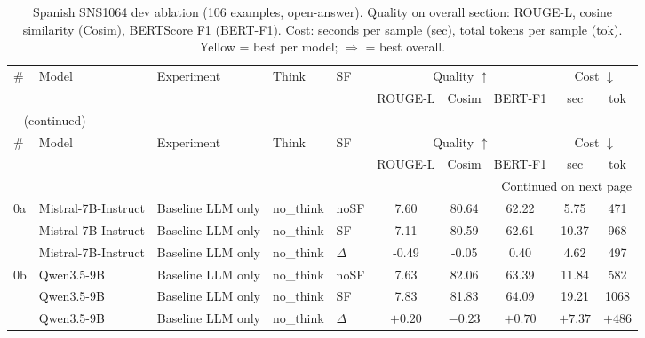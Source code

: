 \begin{scriptsize}
\setlength{\tabcolsep}{3pt}
\setlength{\LTcapwidth}{\linewidth}
\begin{longtable}{l l l l l c c c c c}
\caption[Spanish SNS-1064 dev ablation]{Spanish SNS1064 dev ablation (106 examples, open-answer). Quality on overall section: ROUGE-L, cosine similarity (Cosim), BERTScore F1 (BERT-F1). Cost: seconds per sample (sec), total tokens per sample (tok). Yellow = best per model; $\Rightarrow$ = best overall.} \label{tab:es-main-sns} \\
\toprule
\# & Model & Experiment & Think & SF & \multicolumn{3}{c}{Quality $\uparrow$} & \multicolumn{2}{c}{Cost $\downarrow$} \\
\cmidrule(lr){6-8}\cmidrule(lr){9-10}
\multicolumn{1}{l}{} & \multicolumn{1}{l}{} & \multicolumn{1}{l}{} & \multicolumn{1}{l}{} & \multicolumn{1}{l}{} & \multicolumn{1}{c}{ROUGE-L} & \multicolumn{1}{c}{Cosim} & \multicolumn{1}{c}{BERT-F1} & \multicolumn{1}{c}{sec} & \multicolumn{1}{c}{tok} \\
\midrule
\endfirsthead
\multicolumn{10}{l}{\tablename\ \thetable{} (continued)} \\
\toprule
\# & Model & Experiment & Think & SF & \multicolumn{3}{c}{Quality $\uparrow$} & \multicolumn{2}{c}{Cost $\downarrow$} \\
\cmidrule(lr){6-8}\cmidrule(lr){9-10}
\multicolumn{1}{l}{} & \multicolumn{1}{l}{} & \multicolumn{1}{l}{} & \multicolumn{1}{l}{} & \multicolumn{1}{l}{} & \multicolumn{1}{c}{ROUGE-L} & \multicolumn{1}{c}{Cosim} & \multicolumn{1}{c}{BERT-F1} & \multicolumn{1}{c}{sec} & \multicolumn{1}{c}{tok} \\
\midrule
\endhead
\midrule
\multicolumn{10}{r}{Continued on next page} \\
\endfoot
\bottomrule
\endlastfoot
0a & Mistral-7B-Instruct & Baseline LLM only & no\_think & noSF & 7.60 & 80.64 & 62.22 & 5.75 & 471 \\
 & Mistral-7B-Instruct & Baseline LLM only & no\_think & SF & 7.11 & 80.59 & 62.61 & 10.37 & 968 \\
 & Mistral-7B-Instruct & Baseline LLM only & no\_think & $\Delta$ & -0.49 & -0.05 & 0.40 & 4.62 & 497 \\
0b & Qwen3.5-9B & Baseline LLM only & no\_think & noSF & 7.63 & 82.06 & 63.39 & 11.84 & 582 \\
 & Qwen3.5-9B & Baseline LLM only & no\_think & SF & 7.83 & 81.83 & 64.09 & 19.21 & 1068 \\
 & Qwen3.5-9B & Baseline LLM only & no\_think & $\Delta$ & $+0.20$ & $-0.23$ & $+0.70$ & $+7.37$ & $+486$ \\

\end{longtable}
\end{scriptsize}

